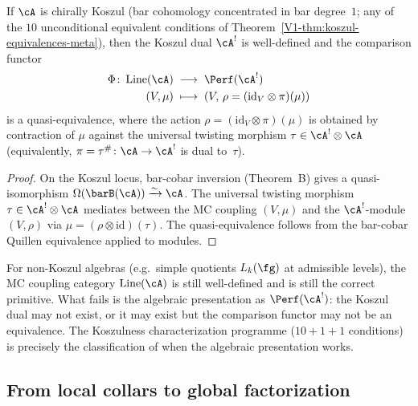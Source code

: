 \begin{theorem}
\label{thm:koszul-comparison-mc}
If $\cA$ is chirally Koszul
\textup{(}bar cohomology concentrated in bar degree~$1$;
any of the $10$ unconditional equivalent conditions of
Theorem~\textup{\ref{V1-thm:koszul-equivalences-meta}}\textup{)},
then the Koszul dual $\cA^!$ is well-defined and the
comparison functor
\begin{align*}
 \Phi \colon \operatorname{Line}(\cA)
 &\;\longrightarrow\; \Perf(\cA^!) \\
 (V, \mu) &\;\longmapsto\;
 (V,\, \rho = (\mathrm{id}_V \otimes \pi)(\mu))
\end{align*}
is a quasi-equivalence, where the action
$\rho = (\mathrm{id}_V \otimes \pi)(\mu)$ is obtained by
contraction of $\mu$ against the universal twisting morphism
$\tau \in \cA^! \otimes \cA$ \textup{(}equivalently,
$\pi = \tau^\# \colon \cA \to \cA^!$ is dual to~$\tau$\textup{)}.
\end{theorem}

\begin{proof}
On the Koszul locus, bar-cobar inversion
(Theorem~B) gives a quasi-isomorphism
$\Omega(\barB(\cA)) \xrightarrow{\sim} \cA$. The universal
twisting morphism $\tau \in \cA^! \otimes \cA$ mediates between
the MC coupling $(V, \mu)$ and the $\cA^!$-module
$(V, \rho)$ via $\mu = (\rho \otimes \mathrm{id})(\tau)$.
The quasi-equivalence follows from the bar-cobar Quillen
equivalence applied to modules.
\end{proof}

\begin{remark}
\label{rem:off-koszul-locus}
For non-Koszul algebras \textup{(}e.g.\ simple quotients
$L_k(\fg)$ at admissible levels\textup{)}, the MC coupling category
$\operatorname{Line}(\cA)$ is still well-defined and is still the
correct primitive. What fails is the algebraic presentation as
$\Perf(\cA^!)$: the Koszul dual may not exist, or it may exist
but the comparison functor may not be an equivalence.
The Koszulness characterization programme
\textup{(}$10{+}1{+}1$ conditions\textup{)} is precisely the
classification of when the algebraic presentation works.
\end{remark}

\subsection{From local collars to global factorization}
\label{subsec:local-to-global-factorization}

